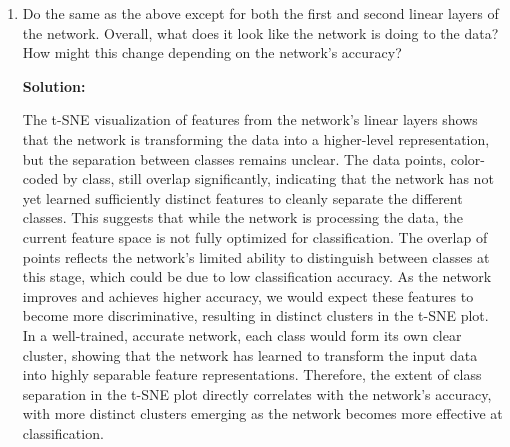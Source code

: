 \documentclass{article}
\newenvironment{solution}{\color{blue} \smallskip \textbf{Solution:}}{}
\begin{document}
\begin{enumerate}
\begin{solution}


By using the hook function, we can save the output of the third convolutional layer for each data point and then perform t-SNE on these learned features. When visualizing the t-SNE plot, we observe that although some class separations exist, many classes overlap, and the clusters are not distinctly separated. This behavior is expected because the third convolutional layer captures mid-level features such as edges and textures, which are not yet fully refined for class-level discrimination. The network at this stage focuses more on patterns and low-level representations rather than classifying objects. More separation might be observed in layers closer to the final classification layer, where the network refines features to be more representative of specific classes.


\end{solution}

\newpage
\item Do the same as the above except for both the first and second linear layers of the network. Overall, what does it look like the network is doing to the data? How might this change depending on the network's accuracy?

\begin{solution}


The t-SNE visualization of features from the network's linear layers shows that the network is transforming the data into a higher-level representation, but the separation between classes remains unclear. The data points, color-coded by class, still overlap significantly, indicating that the network has not yet learned sufficiently distinct features to cleanly separate the different classes. This suggests that while the network is processing the data, the current feature space is not fully optimized for classification. The overlap of points reflects the network's limited ability to distinguish between classes at this stage, which could be due to low classification accuracy. As the network improves and achieves higher accuracy, we would expect these features to become more discriminative, resulting in distinct clusters in the t-SNE plot. In a well-trained, accurate network, each class would form its own clear cluster, showing that the network has learned to transform the input data into highly separable feature representations. Therefore, the extent of class separation in the t-SNE plot directly correlates with the network's accuracy, with more distinct clusters emerging as the network becomes more effective at classification.


\end{solution}

\end{enumerate}
\end{document}
